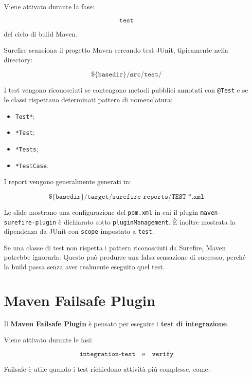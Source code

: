 Viene attivato durante la fase:

\[
\texttt{test}
\]

del ciclo di build Maven.

Surefire scansiona il progetto Maven cercando test JUnit, tipicamente nella directory:

\[
\texttt{\$\{basedir\}/src/test/}
\]

I test vengono riconosciuti se contengono metodi pubblici annotati con \texttt{@Test} e se le classi rispettano determinati pattern di nomenclatura:

\begin{itemize}
    \item \texttt{Test*};
    \item \texttt{*Test};
    \item \texttt{*Tests};
    \item \texttt{*TestCase}.
\end{itemize}

I report vengono generalmente generati in:

\[
\texttt{\$\{basedir\}/target/surefire-reports/TEST-*.xml}
\]

\begin{notaslide}
Le slide mostrano una configurazione del \texttt{pom.xml} in cui il plugin \texttt{maven-surefire-plugin} è dichiarato sotto \texttt{pluginManagement}. È inoltre mostrata la dipendenza da JUnit con \texttt{scope} impostato a \texttt{test}.
\end{notaslide}

\begin{notaesame}
Se una classe di test non rispetta i pattern riconosciuti da Surefire, Maven potrebbe ignorarla. Questo può produrre una falsa sensazione di successo, perché la build passa senza aver realmente eseguito quel test.
\end{notaesame}

\section{Maven Failsafe Plugin}

Il \textbf{Maven Failsafe Plugin} è pensato per eseguire i \textbf{test di integrazione}.

Viene attivato durante le fasi:

\[
\texttt{integration-test}
\quad \text{e} \quad
\texttt{verify}
\]

Failsafe è utile quando i test richiedono attività più complesse, come:

